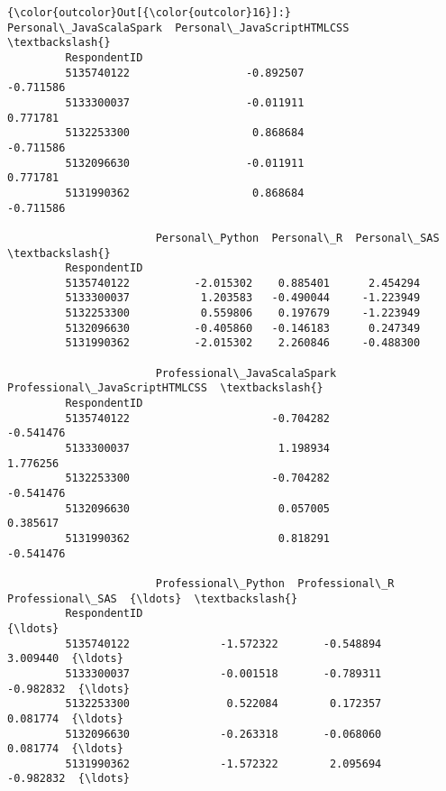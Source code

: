 \documentclass[11pt]{article}
\begin{document}
\begin{Verbatim}[commandchars=\\\{\}]
{\color{outcolor}Out[{\color{outcolor}16}]:}               Personal\_JavaScalaSpark  Personal\_JavaScriptHTMLCSS  \textbackslash{}
         RespondentID                                                        
         5135740122                  -0.892507                   -0.711586   
         5133300037                  -0.011911                    0.771781   
         5132253300                   0.868684                   -0.711586   
         5132096630                  -0.011911                    0.771781   
         5131990362                   0.868684                   -0.711586   
         
                       Personal\_Python  Personal\_R  Personal\_SAS  \textbackslash{}
         RespondentID                                              
         5135740122          -2.015302    0.885401      2.454294   
         5133300037           1.203583   -0.490044     -1.223949   
         5132253300           0.559806    0.197679     -1.223949   
         5132096630          -0.405860   -0.146183      0.247349   
         5131990362          -2.015302    2.260846     -0.488300   
         
                       Professional\_JavaScalaSpark  Professional\_JavaScriptHTMLCSS  \textbackslash{}
         RespondentID                                                                
         5135740122                      -0.704282                       -0.541476   
         5133300037                       1.198934                        1.776256   
         5132253300                      -0.704282                       -0.541476   
         5132096630                       0.057005                        0.385617   
         5131990362                       0.818291                       -0.541476   
         
                       Professional\_Python  Professional\_R  Professional\_SAS  {\ldots}  \textbackslash{}
         RespondentID                                                         {\ldots}   
         5135740122              -1.572322       -0.548894          3.009440  {\ldots}   
         5133300037              -0.001518       -0.789311         -0.982832  {\ldots}   
         5132253300               0.522084        0.172357          0.081774  {\ldots}   
         5132096630              -0.263318       -0.068060          0.081774  {\ldots}   
         5131990362              -1.572322        2.095694         -0.982832  {\ldots}   
         

\end{Verbatim}
\end{document}
